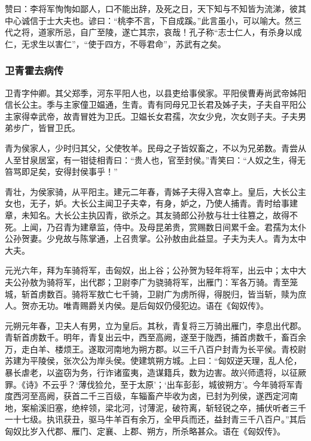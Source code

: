 \documentclass[]{article}
\begin{document}
赞曰：李将军恂恂如鄙人，口不能出辞，及死之日，天下知与不知皆为流涕，彼其中心诚信于士大夫也。谚曰：``桃李不言，下自成蹊。''此言虽小，可以喻大。然三代之将，道家所忌，自广至陵，遂亡其宗，哀哉！孔子称``志士仁人，有杀身以成仁，无求生以害仁''，``使于四方，不辱君命''，苏武有之矣。

\hypertarget{header-n4447}{%
\subsubsection{卫青霍去病传}\label{header-n4447}}

卫青字仲卿。其父郑季，河东平阳人也，以县吏给事侯家。平阳侯曹寿尚武帝姊阳信长公主。季与主家僮卫媪通，生青。青有同母兄卫长君及姊子夫，子夫自平阳公主家得幸武帝，故青冒姓为卫氏。卫媪长女君孺，次女少皃，次女则子夫。子夫男弟步广，皆冒卫氏。

青为侯家人，少时归其父，父使牧羊。民母之子皆奴畜之，不以为兄弟数。青尝从人至甘泉居室，有一钳徒相青曰：``贵人也，官至封侯。''青笑曰：``人奴之生，得无笞骂即足矣，安得封侯事乎！''

青壮，为侯家骑，从平阳主。建元二年春，青姊子夫得入宫幸上。皇后，大长公主女也，无子，妒。大长公主闻卫子夫幸，有身，妒之，乃使人捕青。青时给事建章，未知名。大长公主执囚青，欲杀之。其友骑郎公孙敖与壮士往篡之，故得不死。上闻，乃召青为建章监，侍中。及母昆弟贵，赏赐数日间累千金。君孺为太仆公孙贺妻。少皃故与陈掌通，上召贵掌。公孙敖由此益显。子夫为夫人。青为太中大夫。

元光六年，拜为车骑将军，击匈奴，出上谷；公孙贺为轻年将军，出云中；太中大夫公孙敖为骑将军，出代郡；卫尉李广为骁骑将军，出雁门：军各万骑。青至笼城，斩首虏数百。骑将军敖亡七千骑，卫尉广为虏所得，得脱归，皆当斩，赎为庶人。贺亦无功。唯青赐爵关内侯。是后匈奴仍侵犯边。语在《匈奴传》。

元朔元年春，卫夫人有男，立为皇后。其秋，青复将三万骑出雁门，李息出代郡。青斩首虏数千。明年，青复出云中，西至高阙，遂至于陇西，捕首虏数千，畜百余万，走白羊、楼烦王。遂取河南地为朔方郡。以三千八百户封青为长平侯。青校尉苏建为平陵侯，张次公为岸头侯。使建筑朔方城。上曰：``匈奴逆天理，乱人伦，暴长虐老，以盗窃为务，行诈诸蛮夷，造谋籍兵，数为边害。故兴师遗将，以征厥罪。《诗》不云乎？`薄伐猃允，至于太原'；`出车彭彭，城彼朔方'。今年骑将军青度西河至高阙，获首二千三百级，车辎畜产毕收为卤，已封为列侯，遂西定河南地，案榆溪旧塞，绝梓领，梁北河，讨薄泥，破符离，斩轻锐之卒，捕伏听者三千一十七级。执讯获丑，驱马牛羊百有余万，全甲兵而还，益封青三千八百户。''其后匈奴比岁入代郡、雁门、定襄、上郡、朔方，所杀略甚众。语在《匈奴传》。
\end{document}
